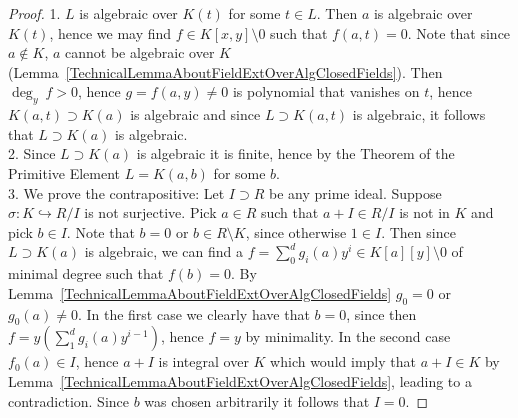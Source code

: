 \begin{proof}
    1. $L$ is algebraic over $K(t)$ for some $t\in L$. Then $a$ is algebraic over $K(t)$, hence we may find $f\in K[x,y]\setminus 0$ such that $f(a,t)=0$. Note that since $a\notin K$, $a$ cannot be algebraic over $K$ (Lemma~\ref{TechnicalLemmaAboutFieldExtOverAlgClosedFields}). Then $\deg_y \ f >0$, hence $g=f(a,y)\neq 0$ is polynomial that vanishes on $t$, hence $K(a,t)\supset K(a)$ is algebraic and since $L\supset K(a,t)$ is algebraic, it follows that $L\supset K(a)$ is algebraic.\\
    2. Since $L\supset K(a)$ is algebraic it is finite, hence by the Theorem of the Primitive Element $L=K(a,b)$ for some $b$.\\
    3. We prove the contrapositive: Let $I\supset R$ be any prime ideal. Suppose $\sigma: K\hookrightarrow R/I$ is not surjective. Pick $a\in R$ such that $a+I\in R/I$ is not in $K$ and pick $b\in I$. Note that $b=0$ or $b\in R\setminus K$, since otherwise $1\in I$. Then since $L\supset K(a)$ is algebraic, we can find a $f=\sum_0^d g_i(a)y^i\in K[a][y]\setminus 0$ of minimal degree such that $f(b)=0$. By Lemma~\ref{TechnicalLemmaAboutFieldExtOverAlgClosedFields} $g_0=0$ or $g_0(a)\neq 0$. In the first case we clearly have that $b=0$, since then $f=y(\sum_1^d g_i(a)y^{i-1})$, hence $f=y$ by minimality. In the second case $f_0(a)\in I$, hence $a+I$ is integral over $K$ which would imply that $a+I\in K$ by Lemma~\ref{TechnicalLemmaAboutFieldExtOverAlgClosedFields}, leading to a contradiction. Since $b$ was chosen arbitrarily it follows that $I=0$.
\end{proof}
